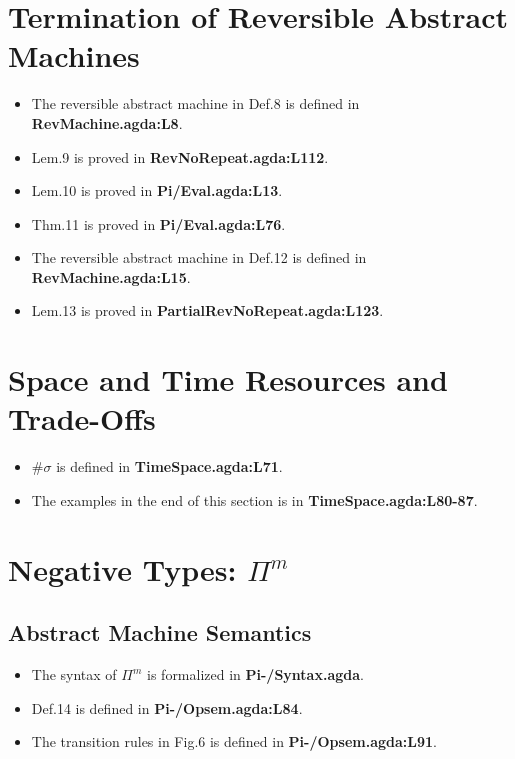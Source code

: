 \documentclass{article}
\begin{document}
\section{Termination of Reversible Abstract Machines}
\begin{itemize}
\item The reversible abstract machine in Def.8 is defined in \textbf{RevMachine.agda:L8}.
\item Lem.9 is proved in \textbf{RevNoRepeat.agda:L112}.
\item Lem.10 is proved in \textbf{Pi/Eval.agda:L13}.
\item Thm.11 is proved in \textbf{Pi/Eval.agda:L76}.
\item The reversible abstract machine in Def.12 is defined in \textbf{RevMachine.agda:L15}.
\item Lem.13 is proved in \textbf{PartialRevNoRepeat.agda:L123}.
\end{itemize}

\section{Space and Time Resources and Trade-Offs}
\begin{itemize}
\item $\# \sigma$ is defined in \textbf{TimeSpace.agda:L71}.
\item The examples in the end of this section is in \textbf{TimeSpace.agda:L80-87}.
\end{itemize}

\section{Negative Types: $\Pi^m$}
\subsection{Abstract Machine Semantics}
\begin{itemize}
\item The syntax of $\Pi^m$ is formalized in \textbf{Pi-/Syntax.agda}.
\item Def.14 is defined in \textbf{Pi-/Opsem.agda:L84}.
\item The transition rules in Fig.6 is defined in \textbf{Pi-/Opsem.agda:L91}.
\end{itemize}
\end{document}
